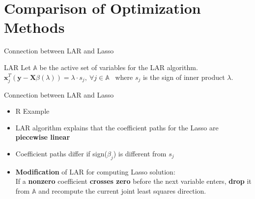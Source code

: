 \documentclass[handout]{beamer}
\begin{document}
\section{Comparison of Optimization Methods} %
\begin{frame}{Connection between LAR and Lasso}

\begin{block}{LAR}
\vspace*{2mm}
Let \(\mathbb{A}\) be the active set of variables for the LAR algorithm. \(\textbf{x}_j^T (\textbf{y}-\textbf{X}\beta(\lambda))=\lambda \cdot s_j,\ 
\forall j \in \mathbb{A}\) \ where \(s_j\) is the sign of inner product \(\lambda\).\\
\end{block} 

\vspace*{3mm}

\end{frame}

\begin{frame}{Connection between LAR and Lasso}
\begin{itemize}
    \item  R Example
    \vspace*{3mm}
    \item LAR algorithm explains that the coefficient paths for the Lasso are \textbf{piecewise linear}
    \vspace*{3mm}
    \item Coefficient paths differ if sign(\(\beta_j\)) is different from $s_j$ 
    \vspace*{3mm}
    
    \item \textbf{Modification} of LAR for computing Lasso solution: \\
If a \textbf{nonzero} coefficient \textbf{crosses zero} before the next
variable enters, \textbf{drop} it from \(\mathbb{A}\) and recompute the current joint least squares
direction.
    
\end{itemize}
\end{frame}
\end{document}
